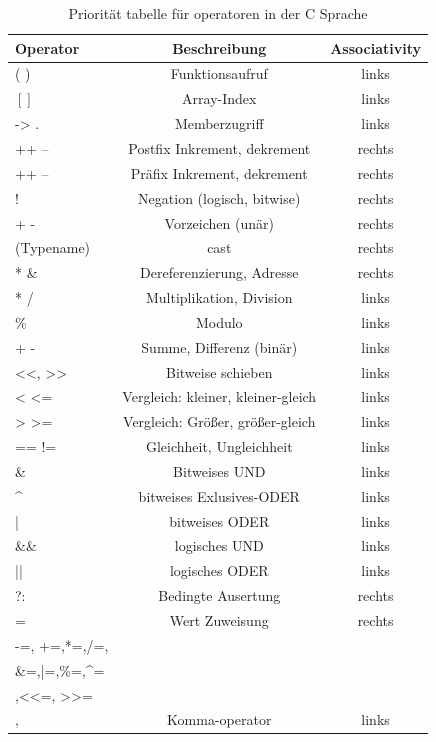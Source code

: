 \documentclass{article}[12pt]
\begin{document}
\begin{table}
\caption{Priorität tabelle für operatoren in der C Sprache\label{priortab}}
\centering
\begin{tabular}{| l c c|}
\hline
Operator & Beschreibung    & Associativity  \\
\hline
( )      & Funktionsaufruf & links  \\
$[ ]$     & Array-Index     & links  \\
-> .     & Memberzugriff   & links \\
++ -- 	 & Postfix Inkrement, dekrement &rechts \\
\hline
++ --    & Präfix  Inkrement, dekrement &rechts \\
! ~      & Negation (logisch, bitwise)  &rechts \\
+ -      & Vorzeichen (unär)            &rechts \\
(Typename) & cast                       &rechts \\
* \&       & Dereferenzierung, Adresse  &rechts \\
\hline
* /        & Multiplikation, Division     &links \\
\%         & Modulo                       &links \\
\hline
+ -        & Summe, Differenz (binär)     &links \\  
\hline
<<, >>     & Bitweise schieben            &links\\
\hline
< <=       & Vergleich: kleiner, kleiner-gleich      &links\\
> >=       & Vergleich: Größer, größer-gleich        &links\\
\hline
== !=      &Gleichheit, Ungleichheit                 &links\\
\hline
\&         & Bitweises UND & links \\
\hline
\^{}         & bitweises Exlusives-ODER &links\\
\hline
|          & bitweises ODER           &links\\
\hline
\&\&       & logisches UND            &links\\
\hline
||         & logisches ODER           &links\\
\hline
?:         & Bedingte Ausertung       &rechts\\
\hline
=          & Wert Zuweisung           &rechts\\
\hline
-=, +=,*=,/=,   &                     &      \\
\&=,|=,\%=,\^{}=&                     &      \\
,<<=, >>=& \raisebox{1.5ex}{Kombinierte Zuweisungsoperator} & \raisebox{1.5ex}{rechts}\\
\hline
,                                   & Komma-operator                 & links \\
\hline
\end{tabular}
\end{table}
\end{document}
